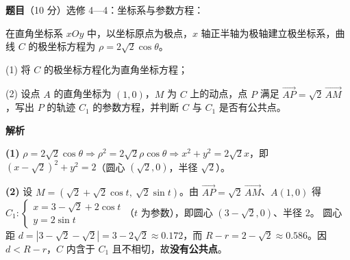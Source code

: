\begin{answer}

\textbf{题目}（10 分）选修 4—4：坐标系与参数方程：

在直角坐标系 $xOy$ 中，以坐标原点为极点，$x$ 轴正半轴为极轴建立极坐标系，曲线 $C$ 的极坐标方程为 $\rho=2\sqrt2\cos\theta$。

  (1) 将 $C$ 的极坐标方程化为直角坐标方程；

  (2) 设点 $A$ 的直角坐标为 $(1,0)$，$M$ 为 $C$ 上的动点，点 $P$ 满足 $\overrightarrow{AP}=\sqrt2\,\overrightarrow{AM}$，写出 $P$ 的轨迹 $C_1$ 的参数方程，并判断 $C$ 与 $C_1$ 是否有公共点。

\textbf{解析}

\begin{gktip}
\textbf{(1)} $\rho=2\sqrt2\cos\theta\Rightarrow\rho^2=2\sqrt2\rho\cos\theta\Rightarrow x^2+y^2=2\sqrt2x$，即 $(x-\sqrt2)^2+y^2=2$（圆心 $(\sqrt2,0)$，半径 $\sqrt2$）。

\textbf{(2)} 设 $M=(\sqrt2+\sqrt2\cos t,\ \sqrt2\sin t)$。由 $\overrightarrow{AP}=\sqrt2\,\overrightarrow{AM}$、$A(1,0)$ 得
$C_1:\begin{cases}x=3-\sqrt2+2\cos t\\ y=2\sin t\end{cases}$（$t$ 为参数），即圆心 $(3-\sqrt2,0)$、半径 $2$。
圆心距 $d=|3-\sqrt2-\sqrt2|=3-2\sqrt2\approx0.172$，而 $R-r=2-\sqrt2\approx0.586$。因 $d<R-r$，$C$ 内含于 $C_1$ 且不相切，故\textbf{没有公共点}。
\end{gktip}



\end{answer}
